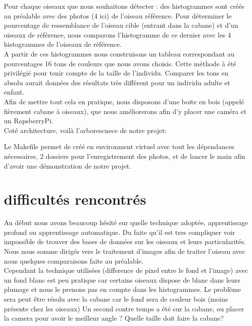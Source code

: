 \documentclass{article}
\begin{document}
Pour chaque oiseaux que nous souhaitons détecter : des histogrammes sont créés au préalable avec des photos (4 ici) de l'oiseau référence.
Pour déterminer le pourcentage de ressemblance de l'oiseau cible (entrant dans la cabane) et d'un oiseaux de référence, nous comparons l'histogramme de ce dernier avec les 4 histogrammes de l'oiseaux de référence. \\

A partir de ces histogrammes nous construisons un tableau correspondant au pourcentages 16 tons de couleurs que nous avons choisis.
Cette méthode à été privilégié pour tenir compte de la taille de l'individu.
Comparer les tons en absolu aurait données des résultats très différent pour un individu adulte et enfant. \\

Afin de mettre tout cela en pratique, nous disposons d'une boite en bois  (appelé fièrement cabane à oiseaux), que nous améliorerons afin d'y placer une caméra et un RapsberryPi.\\

Coté architecture, voilà l'arborescnece de notre projet:


Le Makefile permet de créé en environment virtuel avec tout les dépendances nécessaires, 2 dossiers pour l'enregistrement des photos, et de lancer le main afin d'avoir une démonstration de notre projet.\\

\section{difficultés rencontrés}
Au début nous avons beaucoup hésité sur quelle technique adoptée, apprentissage profond ou apprentissage automatique. Du faite qu'il est tres compliquer voir  impossible de trouver des bases de données sur les oiseaux et leurs particularités. Nous nous somme dirigés vers le traitement d'images afin de traiter l'oiseau avec nous quelques comparaisons faite au préalable. \\ 
Cependant la technique utilisées (difference de pixel entre le fond et l'image) avec un fond blanc est peu pratique car certains oiseaux dispose de blanc dans leurs plumage et nous le prenons pas en compte dans les histogrammes. Le problème sera peut être résolu avec la cabane car le fond sera de couleur bois (moins présente chez les oiseaux)
Un second contre temps a été sur la cabane, ou placer la camera pour avoir le meilleur angle ? Quelle taille doit faire la cabane? 
\end{document}
